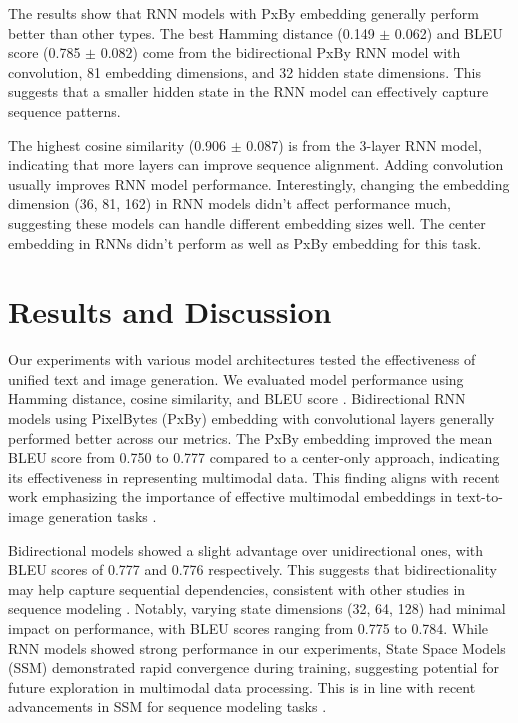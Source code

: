 \documentclass[10pt,a4paper]{article}
\begin{document}
The results show that RNN models with PxBy embedding generally perform better than other types. The best Hamming distance (0.149 $\pm$ 0.062) and BLEU score (0.785 $\pm$ 0.082) come from the bidirectional PxBy RNN model with convolution, 81 embedding dimensions, and 32 hidden state dimensions. This suggests that a smaller hidden state in the RNN model can effectively capture sequence patterns.

The highest cosine similarity (0.906 $\pm$ 0.087) is from the 3-layer RNN model, indicating that more layers can improve sequence alignment. Adding convolution usually improves RNN model performance. Interestingly, changing the embedding dimension (36, 81, 162) in RNN models didn't affect performance much, suggesting these models can handle different embedding sizes well. The center embedding in RNNs didn't perform as well as PxBy embedding for this task.

\section{Results and Discussion}

Our experiments with various model architectures tested the effectiveness of unified text and image generation. We evaluated model performance using Hamming distance, cosine similarity, and BLEU score \cite{papineni2002bleu}. Bidirectional RNN models using PixelBytes (PxBy) embedding with convolutional layers generally performed better across our metrics. The PxBy embedding improved the mean BLEU score from 0.750 to 0.777 compared to a center-only approach, indicating its effectiveness in representing multimodal data. This finding aligns with recent work emphasizing the importance of effective multimodal embeddings in text-to-image generation tasks \cite{yan2024multimodal}.

Bidirectional models showed a slight advantage over unidirectional ones, with BLEU scores of 0.777 and 0.776 respectively. This suggests that bidirectionality may help capture sequential dependencies, consistent with other studies in sequence modeling \cite{schuster1997bidirectional}. Notably, varying state dimensions (32, 64, 128) had minimal impact on performance, with BLEU scores ranging from 0.775 to 0.784. While RNN models showed strong performance in our experiments, State Space Models (SSM) demonstrated rapid convergence during training, suggesting potential for future exploration in multimodal data processing. This is in line with recent advancements in SSM for sequence modeling tasks \cite{gu2022efficiently}.
\end{document}
